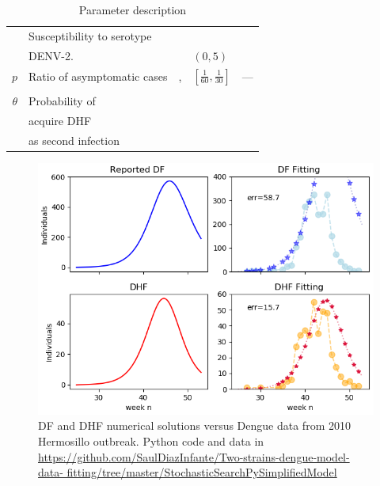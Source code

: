 \begin{table}[htb]
\begin{tabular}{rl m{1.9cm} ll}
			& Susceptibility to serotype 
		\\
			& \ac{DENV-2}.
			& \cite{Feng1997a}
			& $(0,5)$
      \\
            $p$ 
            & 
            Ratio of asymptomatic cases
            &
            \cite{balmaseda2006high},
            &
            $[\frac{1}{60}, \frac{1}{30}]$
            & ---
            \\
            & &
            \cite{Chastel2011, Chastel2012a}
            \\
			$\theta$
			& Probability of 
			\\
			& acquire DHF 
			\\
			& as second infection
			\\
			\bottomrule
		\end{tabular}
	\caption{Parameter description}
	\label{tbl:parameter_description}
\end{table}

%
\begin{figure}
	\centering
	\includegraphics[width=\textwidth, keepaspectratio]{fitting_DF_DHF.png}
	\caption{DF and DHF numerical solutions versus
		Dengue data from 2010 Hermosillo outbreak. Python code and
    data in 
    \href{github}{https://github.com/SaulDiazInfante/Two-strains-dengue-model-data-%
        fitting/tree/master/StochasticSearchPySimplifiedModel}
	}\label{fig:fitting}
\end{figure}

